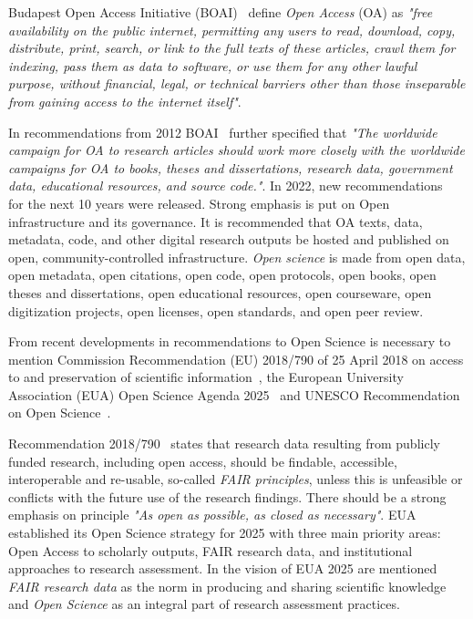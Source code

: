 \documentclass{article}
\begin{document}
Budapest Open Access Initiative (BOAI)~\cite{2002_OSI} define \textit{Open Access} (OA) as \textit{"free availability on the public internet, permitting any users to read, download, copy, distribute, print, search, or link to the full texts of these articles, crawl them for indexing, pass them as data to software, or use them for any other lawful purpose, without financial, legal, or technical barriers other than those inseparable from gaining access to the internet itself"}.

In recommendations from 2012 BOAI~\cite{2012_OSI} further specified that \textit{"The worldwide campaign for OA to research articles should work more closely with the worldwide campaigns for OA to books, theses and dissertations, research data, government data, educational resources, and source code."}. In 2022, new recommendations~\cite{2022_OSI} for the next 10 years were released. Strong emphasis is put on Open infrastructure and its governance. It is recommended that OA texts, data, metadata, code, and other digital research outputs be hosted and published on open, community-controlled infrastructure. \textit{Open science} is made from open data, open metadata, open citations, open code, open protocols, open books, open theses and dissertations, open educational resources, open courseware, open digitization projects, open licenses, open standards, and open peer review.

From recent developments in recommendations to Open Science is necessary to mention Commission Recommendation (EU) 2018/790 of 25 April 2018 on access to and preservation of scientific information~\cite{2018_EU_2018/790}, the European University Association (EUA) Open Science Agenda 2025~\cite{2022_EUA} and UNESCO Recommendation on Open Science~\cite{2022_EUA}.

Recommendation 2018/790~\cite{2018_EU_2018/790} states that research data resulting from publicly funded research, including open access, should be findable, accessible, interoperable and re-usable, so-called \textit{FAIR principles}, unless this is unfeasible or conflicts with the future use of the research findings. There should be a strong emphasis on principle \textit{"As open as possible, as closed as necessary"}. 
EUA~\cite{2022_EUA} established its Open Science strategy for 2025 with three main priority areas: Open Access to scholarly outputs, FAIR research data, and institutional approaches to research assessment. In the vision of EUA 2025 are mentioned \textit{FAIR research data} as the norm in producing and sharing scientific knowledge and \textit{Open Science} as an integral part of research assessment practices.
\end{document}

